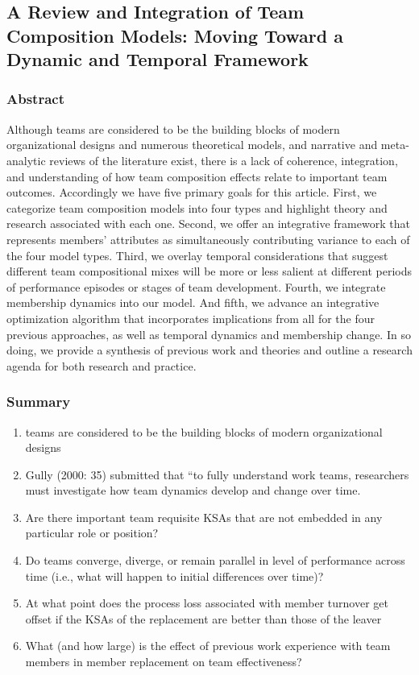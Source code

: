 \documentclass[12pt]{article}
\begin{document}

\subsection*{A Review and Integration of Team Composition Models: Moving Toward a Dynamic and Temporal Framework\cite{dynamic_teams_review}}

\subsubsection*{Abstract}
Although teams are considered to be the building blocks of modern organizational designs and numerous theoretical models, and narrative and meta-analytic reviews of the literature exist, there is a lack of coherence, integration, and understanding of how team composition effects relate to important team outcomes. Accordingly we have five primary goals for this article. First, we categorize team composition models into four types and highlight theory and research associated with each one. Second, we offer an integrative framework that represents members’ attributes as simultaneously contributing variance to each of the four model types. Third, we overlay temporal considerations that suggest different team compositional mixes will be more or less salient at different periods of performance episodes or stages of team development. Fourth, we integrate membership dynamics into our model. And fifth, we advance an integrative optimization algorithm that incorporates implications from all for the four previous approaches, as well as temporal dynamics and membership change. In so doing, we provide a synthesis of previous work and theories and outline a research agenda for both research and practice. 

\subsubsection*{Summary}
\begin{enumerate}
    \item teams are considered to be the building blocks of modern organizational designs
    \item Gully (2000: 35) submitted that “to fully understand work teams, researchers must investigate how team dynamics develop and change over time.
    \item Are there important team requisite KSAs that are not embedded in any particular role or position?
    \item Do teams converge, diverge, or remain parallel in level of performance across time (i.e., what will happen to initial differences over time)?
    \item At what point does the process loss associated with member turnover get offset if the KSAs of the replacement are better than those of the leaver
    \item What (and how large) is the effect of previous work experience with team members in member replacement on team effectiveness?
\end{enumerate}
\end{document}
